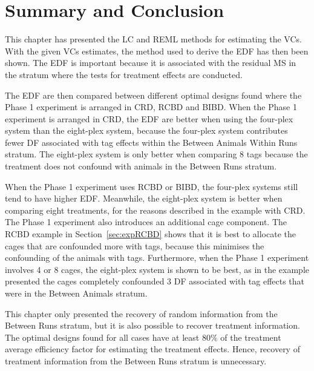 \documentclass[12pt,a4paper]{article}
\begin{document}
\section{Summary and Conclusion}
\label{sec:conclusion}
This chapter has presented the LC and REML methods for estimating the VCs. With the given VCs estimates, the method used to derive the EDF has then been shown. The EDF is important because it is associated with the residual MS in the stratum where the tests for treatment effects are conducted. 

The EDF are then compared between different optimal designs found where the Phase 1 experiment is arranged in CRD, RCBD and BIBD. When the Phase 1 experiment is arranged in CRD, the EDF are better when using the four-plex system than the eight-plex system, because the four-plex system contributes fewer DF associated with tag effects within the Between Animals Within Runs stratum. The eight-plex system is only better when comparing 8 tags because the treatment does not confound with animals in the Between Runs stratum. 

When the Phase 1 experiment uses RCBD or BIBD, the four-plex systems still tend to have higher EDF. Meanwhile, the eight-plex system is better when comparing eight treatments, for the reasons described in the example with CRD. The Phase 1 experiment also introduces an additional cage component. The RCBD example in Section~\ref{sec:expRCBD} shows that it is best to allocate the cages that are confounded more with tags, because this minimises the confounding of the animals with tags. Furthermore, when the Phase 1 experiment involves 4 or 8 cages, the eight-plex system is shown to be best, as in the example presented the cages completely confounded 3 DF associated with tag effects that were in the Between Animals stratum.   

This chapter only presented the recovery of random information from the Between Runs stratum, but it is also possible to recover treatment information. The optimal designs found for all cases have at least $80\%$ of the treatment average efficiency factor for estimating the treatment effects. Hence, recovery of treatment information from the Between Runs stratum is unnecessary.




\end{document}

